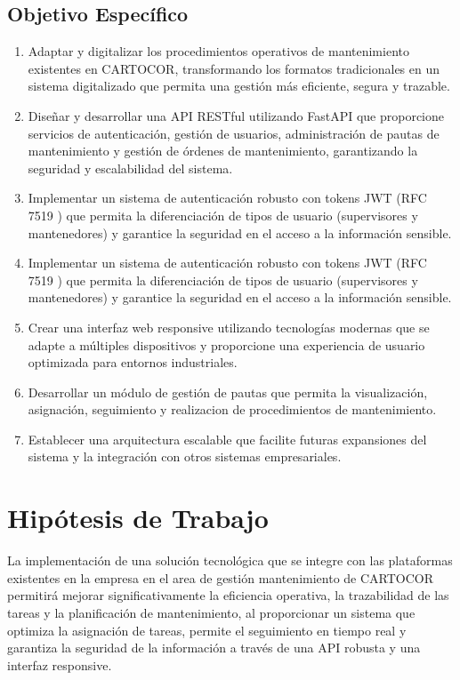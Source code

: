 \documentclass[12pt,a4paper]{report}
\begin{document}
\section*{Objetivo Específico}

\begin{enumerate}
    \item Adaptar y digitalizar los procedimientos operativos de mantenimiento existentes en CARTOCOR, transformando los formatos tradicionales en un sistema digitalizado que permita una gestión más eficiente, segura y trazable.
    \item Diseñar y desarrollar una API RESTful utilizando FastAPI que proporcione servicios de autenticación, gestión de usuarios, administración de pautas de mantenimiento y gestión de órdenes de mantenimiento, garantizando la seguridad y escalabilidad del sistema.
    \item Implementar un sistema de autenticación robusto con tokens JWT (RFC 7519 \cite{rfc7519}) que permita la diferenciación de tipos de usuario (supervisores y mantenedores) y garantice la seguridad en el acceso a la información sensible.
    \item Implementar un sistema de autenticación robusto con tokens JWT (RFC 7519 \cite{rfc7520}) que permita la diferenciación de tipos de usuario (supervisores y mantenedores) y garantice la seguridad en el acceso a la información sensible.
    \item Crear una interfaz web responsive utilizando tecnologías modernas que se adapte a múltiples dispositivos y proporcione una experiencia de usuario optimizada para entornos industriales.
    \item Desarrollar un módulo de gestión de pautas que permita la visualización, asignación, seguimiento y realizacion de procedimientos de mantenimiento.
    \item Establecer una arquitectura escalable que facilite futuras expansiones del sistema y la integración con otros sistemas empresariales.
\end{enumerate}

\chapter*{Hipótesis de Trabajo}
La implementación de una solución tecnológica que se integre con las plataformas existentes en la empresa en el area de gestión mantenimiento de CARTOCOR permitirá mejorar significativamente la eficiencia operativa, la trazabilidad de las tareas y la planificación de mantenimiento, al proporcionar un sistema que optimiza la asignación de tareas, permite el seguimiento en tiempo real y garantiza la seguridad de la información a través de una API robusta y una interfaz responsive.
\end{document}
